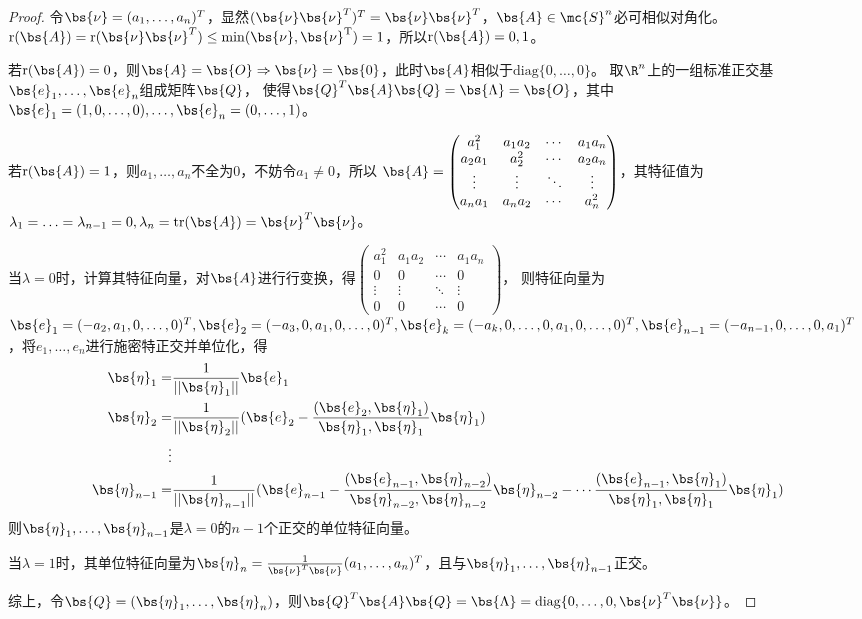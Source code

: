 \documentclass[12pt, a4paper, oneside, UTF8]{ctexbook}
\begin{document}
\begin{proof}
    令$\bs{\nu}=(a_1,\ldots,a_n)^T$，显然$(\bs{\nu}\bs{\nu}^T)^T=\bs{\nu}\bs{\nu}^T$，$\bs{A} \in \mc{S}^n$必可相似对角化。
    $\mathrm{r}(\bs{A})=\mathrm{r}(\bs{\nu}\bs{\nu}^T) \leq \min(\mathrm{\bs{\nu},\mathrm{\bs{\nu}^T}})=1$，所以$\mathrm{r}(\bs{A})=0,1$。
    
    若$\mathrm{r}(\bs{A})=0$，则$\bs{A}=\bs{O} \Rightarrow \bs{\nu}=\bs{0}$，此时$\bs{A}$相似于$\mathrm{diag}\{0,\ldots,0\}$。
    取$\R^n$上的一组标准正交基$\bs{e}_1,\ldots,\bs{e}_n$组成矩阵$\bs{Q}$，
    使得$\bs{Q}^T\bs{A}\bs{Q}=\bs{\Lambda}=\bs{O}$，其中$\bs{e}_1=(1,0,\ldots,0),\ldots,\bs{e}_n=(0,\ldots,1)$。

    若$\mathrm{r}(\bs{A})=1$，则$a_1,\ldots,a_n$不全为0，不妨令$a_1 \neq 0$，所以
    $\bs{A}=\begin{pmatrix}
        a_1^2& a_1a_2 & \cdots & a_1a_n \\
        a_2a_1 & a_2^2 &\cdots & a_2a_n\\
        \vdots &\vdots & \ddots & \vdots \\
        a_na_1& a_na_2&\cdots  & a_n^2 
    \end{pmatrix}$，其特征值为$\lambda_1=\ldots=\lambda_{n-1}=0,\lambda_n=\mathrm{tr}(\bs{A})=\bs{\nu}^T\bs{\nu}$。
    
    当$\lambda=0$时，计算其特征向量，对$\bs{A}$进行行变换，得$\begin{pmatrix}
        a_1^2 & a_1a_2 &\cdots &a_1a_n \\
        0 &0 &\cdots & 0 \\
        \vdots &\vdots & \ddots& \vdots \\
        0 &0 &\cdots &0 
    \end{pmatrix}$，
    则特征向量为$\bs{e}_1=(-a_2,a_1,0,\ldots,0)^T,\bs{e}_2=(-a_3,0,a_1,0,\ldots,0)^T,\bs{e}_k=(-a_k,0,\ldots,0,a_1,0,\ldots,0)^T,
    \bs{e}_{n-1}=(-a_{n-1},0,\ldots,0,a_1)^T$，将$e_1,\ldots,e_n$进行施密特正交并单位化，得
    \begin{align*}
        \bs{\eta}_1=&\frac{1}{||\bs{\eta}_1||} \bs{e}_1 \\
        \bs{\eta}_2=&\frac{1}{||\bs{\eta}_2||}(\bs{e}_2-\frac{(\bs{e}_2,\bs{\eta}_1)}{\bs{\eta}_1,\bs{\eta}_1} \bs{\eta}_1) \\
        \vdots& \\
        \bs{\eta}_{n-1}=&\frac{1}{||\bs{\eta}_{n-1}||}(\bs{e}_{n-1}-\frac{(\bs{e}_{n-1},\bs{\eta}_{n-2})}{\bs{\eta}_{n-2},\bs{\eta}_{n-2}} \bs{\eta}_{n-2}-\cdots\frac{(\bs{e}_{n-1},\bs{\eta}_1)}{\bs{\eta}_1,\bs{\eta}_1} \bs{\eta}_1)
    \end{align*}
    则$\bs{\eta}_1,\ldots,\bs{\eta}_{n-1}$是$\lambda=0$的$n-1$个正交的单位特征向量。

    当$\lambda=1$时，其单位特征向量为$\bs{\eta}_n=\frac{1}{\bs{\nu}^T\bs{\nu}}(a_1,\ldots,a_n)^T$，且与$\bs{\eta}_1,\ldots,\bs{\eta}_{n-1}$正交。

    综上，令$\bs{Q}=(\bs{\eta}_1,\ldots,\bs{\eta}_{n})$，则$\bs{Q}^T\bs{A}\bs{Q}=\bs{\Lambda}=\mathrm{diag}\{0,\ldots,0,\bs{\nu}^T\bs{\nu}\}$。

\end{proof}
\end{document}
